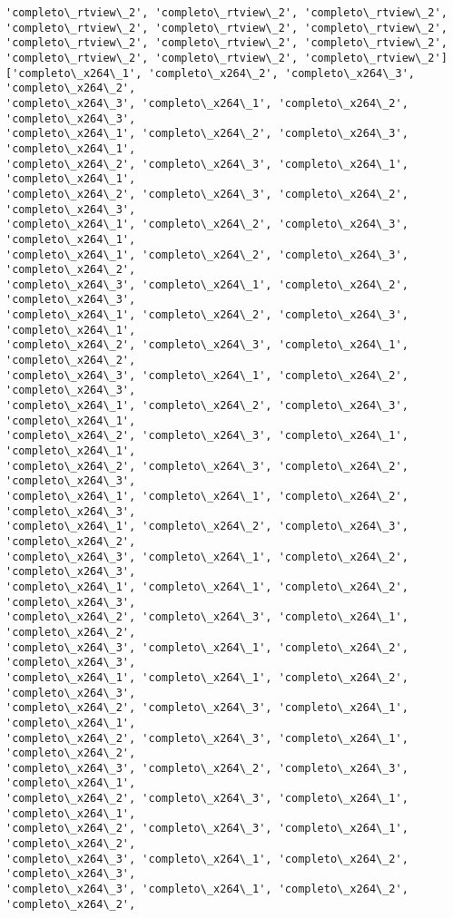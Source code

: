 \documentclass[11pt]{article}
\begin{document}
\begin{Verbatim}[commandchars=\\\{\}]
'completo\_rtview\_2', 'completo\_rtview\_2', 'completo\_rtview\_2',
'completo\_rtview\_2', 'completo\_rtview\_2', 'completo\_rtview\_2',
'completo\_rtview\_2', 'completo\_rtview\_2', 'completo\_rtview\_2',
'completo\_rtview\_2', 'completo\_rtview\_2', 'completo\_rtview\_2']
['completo\_x264\_1', 'completo\_x264\_2', 'completo\_x264\_3', 'completo\_x264\_2',
'completo\_x264\_3', 'completo\_x264\_1', 'completo\_x264\_2', 'completo\_x264\_3',
'completo\_x264\_1', 'completo\_x264\_2', 'completo\_x264\_3', 'completo\_x264\_1',
'completo\_x264\_2', 'completo\_x264\_3', 'completo\_x264\_1', 'completo\_x264\_1',
'completo\_x264\_2', 'completo\_x264\_3', 'completo\_x264\_2', 'completo\_x264\_3',
'completo\_x264\_1', 'completo\_x264\_2', 'completo\_x264\_3', 'completo\_x264\_1',
'completo\_x264\_1', 'completo\_x264\_2', 'completo\_x264\_3', 'completo\_x264\_2',
'completo\_x264\_3', 'completo\_x264\_1', 'completo\_x264\_2', 'completo\_x264\_3',
'completo\_x264\_1', 'completo\_x264\_2', 'completo\_x264\_3', 'completo\_x264\_1',
'completo\_x264\_2', 'completo\_x264\_3', 'completo\_x264\_1', 'completo\_x264\_2',
'completo\_x264\_3', 'completo\_x264\_1', 'completo\_x264\_2', 'completo\_x264\_3',
'completo\_x264\_1', 'completo\_x264\_2', 'completo\_x264\_3', 'completo\_x264\_1',
'completo\_x264\_2', 'completo\_x264\_3', 'completo\_x264\_1', 'completo\_x264\_1',
'completo\_x264\_2', 'completo\_x264\_3', 'completo\_x264\_2', 'completo\_x264\_3',
'completo\_x264\_1', 'completo\_x264\_1', 'completo\_x264\_2', 'completo\_x264\_3',
'completo\_x264\_1', 'completo\_x264\_2', 'completo\_x264\_3', 'completo\_x264\_2',
'completo\_x264\_3', 'completo\_x264\_1', 'completo\_x264\_2', 'completo\_x264\_3',
'completo\_x264\_1', 'completo\_x264\_1', 'completo\_x264\_2', 'completo\_x264\_3',
'completo\_x264\_2', 'completo\_x264\_3', 'completo\_x264\_1', 'completo\_x264\_2',
'completo\_x264\_3', 'completo\_x264\_1', 'completo\_x264\_2', 'completo\_x264\_3',
'completo\_x264\_1', 'completo\_x264\_1', 'completo\_x264\_2', 'completo\_x264\_3',
'completo\_x264\_2', 'completo\_x264\_3', 'completo\_x264\_1', 'completo\_x264\_1',
'completo\_x264\_2', 'completo\_x264\_3', 'completo\_x264\_1', 'completo\_x264\_2',
'completo\_x264\_3', 'completo\_x264\_2', 'completo\_x264\_3', 'completo\_x264\_1',
'completo\_x264\_2', 'completo\_x264\_3', 'completo\_x264\_1', 'completo\_x264\_1',
'completo\_x264\_2', 'completo\_x264\_3', 'completo\_x264\_1', 'completo\_x264\_2',
'completo\_x264\_3', 'completo\_x264\_1', 'completo\_x264\_2', 'completo\_x264\_3',
'completo\_x264\_3', 'completo\_x264\_1', 'completo\_x264\_2', 'completo\_x264\_2',

\end{Verbatim}
\end{document}
